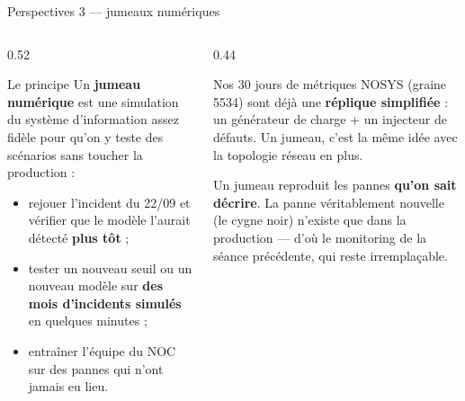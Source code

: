 \begin{frame}{Perspectives 3 --- jumeaux numériques}
\small
\begin{columns}[t]
\begin{column}{0.52\textwidth}
\begin{block}{Le principe}
Un \textbf{jumeau numérique} est une simulation du système d'information
assez fidèle pour qu'on y teste des scénarios sans toucher la production :
\begin{itemize}
\item rejouer l'incident du 22/09 et vérifier que le modèle l'aurait
détecté \textbf{plus tôt} ;
\item tester un nouveau seuil ou un nouveau modèle sur \textbf{des mois
d'incidents simulés} en quelques minutes ;
\item entraîner l'équipe du NOC sur des pannes qui n'ont jamais eu lieu.
\end{itemize}
\end{block}
\end{column}
\begin{column}{0.44\textwidth}
\begin{ebox}
Nos 30 jours de métriques NOSYS (graine 5534) sont déjà une
\textbf{réplique simplifiée} : un générateur de charge + un injecteur de
défauts. Un jumeau, c'est la même idée avec la topologie réseau en plus.
\end{ebox}
\begin{wbox}
Un jumeau reproduit les pannes \textbf{qu'on sait décrire}. La panne
véritablement nouvelle (le cygne noir) n'existe que dans la production ---
d'où le monitoring de la séance précédente, qui reste irremplaçable.
\end{wbox}
\end{column}
\end{columns}
\end{frame}

